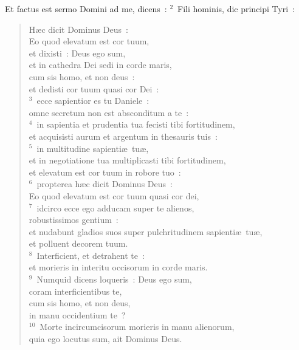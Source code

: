 \lettrine[lines=10,image=true,loversize=0.05,lraise=-0.03]{E}{}t factus est sermo Domini ad me, dicens~:
${}^{2}$~Fili hominis, dic principi Tyri~: \begin{flushleft}\begin{verse}H\ae c dicit Dominus Deus~:\\ Eo quod elevatum est cor tuum,\\ et dixisti~: Deus ego sum,\\ et in cathedra Dei sedi in corde maris,\\ cum sis homo, et non deus~:\\ et dedisti cor tuum quasi cor Dei~:\\
${}^{3}$~ecce sapientior es tu Daniele~:\\ omne secretum non est absconditum a te~:\\
${}^{4}$~in sapientia et prudentia tua fecisti tibi fortitudinem,\\ et acquisisti aurum et argentum in thesauris tuis~:\\
${}^{5}$~in multitudine sapienti\ae\ tu\ae ,\\ et in negotiatione tua multiplicasti tibi fortitudinem,\\ et elevatum est cor tuum in robore tuo~:\\
${}^{6}$~propterea h\ae c dicit Dominus Deus~:\\ Eo quod elevatum est cor tuum quasi cor dei,\\
${}^{7}$~idcirco ecce ego adducam super te alienos,\\ robustissimos gentium~:\\ et nudabunt gladios suos super pulchritudinem sapienti\ae\ tu\ae ,\\ et polluent decorem tuum.\\
${}^{8}$~Interficient, et detrahent te~:\\ et morieris in interitu occisorum in corde maris.\\
${}^{9}$~Numquid dicens loqueris~: Deus ego sum,\\ coram interficientibus te,\\ cum sis homo, et non deus,\\ in manu occidentium te~?\\
${}^{10}$~Morte incircumcisorum morieris in manu alienorum,\\ quia ego locutus sum, ait Dominus Deus.\end{verse}\end{flushleft}


